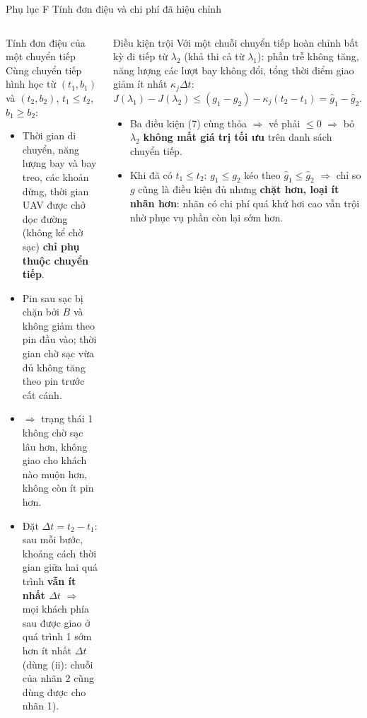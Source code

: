 \documentclass[aspectratio=169,10pt,t,xcolor={table}]{beamer}
\newcommand{\apptitle}[2]{Phụ lục #1 \textperiodcentered{} #2}
\begin{document}
\begin{frame}{\apptitle{F}{Tính đơn điệu và chi phí đã hiệu chỉnh}}
\begin{columns}[T,onlytextwidth]
\begin{block}{Tính đơn điệu của một chuyển tiếp}
\scriptsize Cùng chuyển tiếp hình học từ $(t_1,b_1)$ và $(t_2,b_2)$, $t_1\le t_2$, $b_1\ge b_2$:
\begin{itemize}
\item Thời gian di chuyển, năng lượng bay và bay treo, các khoản dừng, thời gian UAV được chở dọc đường (không kể chờ sạc) \textbf{chỉ phụ thuộc chuyển tiếp}.
\item Pin sau sạc bị chặn bởi $B$ và không giảm theo pin đầu vào; thời gian chờ sạc vừa đủ không tăng theo pin trước cất cánh.
\item $\Rightarrow$ trạng thái 1 không chờ sạc lâu hơn, không giao cho khách nào muộn hơn, không còn ít pin hơn.
\item Đặt $\Delta t=t_2-t_1$: sau mỗi bước, khoảng cách thời gian giữa hai quá trình \textbf{vẫn ít nhất $\Delta t$} $\Rightarrow$ mọi khách phía sau được giao ở quá trình 1 sớm hơn ít nhất $\Delta t$ (dùng (ii): chuỗi của nhãn 2 cũng dùng được cho nhãn 1).
\end{itemize}
\end{block}
\begin{block}{Điều kiện trội}
\scriptsize Với một chuỗi chuyển tiếp hoàn chỉnh bất kỳ đi tiếp từ $\lambda_2$ (khả thi cả từ $\lambda_1$): phần trễ không tăng, năng lượng các lượt bay không đổi, tổng thời điểm giao giảm ít nhất $\kappa_j\Delta t$:
\[
J(\lambda_1)-J(\lambda_2)\le (g_1-g_2)-\kappa_j(t_2-t_1)=\widehat g_1-\widehat g_2.
\]
\begin{itemize}
\item Ba điều kiện (7) cùng thỏa $\Rightarrow$ vế phải $\le0$ $\Rightarrow$ bỏ $\lambda_2$ \textbf{không mất giá trị tối ưu} trên danh sách chuyển tiếp.
\item Khi đã có $t_1\le t_2$: $g_1\le g_2$ kéo theo $\widehat g_1\le\widehat g_2$ $\Rightarrow$ chỉ so $g$ cũng là điều kiện đủ nhưng \textbf{chặt hơn, loại ít nhãn hơn}: nhãn có chi phí quá khứ hơi cao vẫn trội nhờ phục vụ phần còn lại sớm hơn.
\end{itemize}
\end{block}
\end{columns}
\end{frame}
\end{document}
